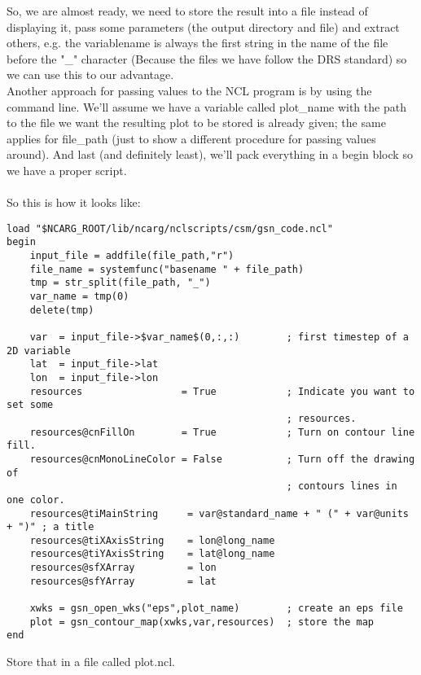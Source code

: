 \documentclass[a4paper,11pt]{ltxdoc}
\begin{document}
So, we are almost ready, we need to store the result into a file instead of displaying it, pass some parameters (the output directory and file) and extract others, e.g. the variablename is always the first string in the name of the file before the "\_" character (Because the files we have follow the DRS standard) so we can use this to our advantage. \\
Another approach for passing values to the NCL program is by using the command line. We'll assume we have a variable called plot\_name with the path to the file we want the resulting plot to be stored is already given; the same applies for file\_path (just to show a different procedure for passing values around). And last (and definitely least), we'll pack everything in a begin block so we have a proper script. \\
\\
So this is how it looks like:
\begin{verbatim}
load "$NCARG_ROOT/lib/ncarg/nclscripts/csm/gsn_code.ncl" 
begin
    input_file = addfile(file_path,"r")
    file_name = systemfunc("basename " + file_path)
    tmp = str_split(file_path, "_")
    var_name = tmp(0)
    delete(tmp)

    var  = input_file->$var_name$(0,:,:)        ; first timestep of a 2D variable
    lat  = input_file->lat                      
    lon  = input_file->lon                      
    resources                 = True            ; Indicate you want to set some
                                                ; resources.
    resources@cnFillOn        = True            ; Turn on contour line fill.
    resources@cnMonoLineColor = False           ; Turn off the drawing of
                                                ; contours lines in one color.
    resources@tiMainString     = var@standard_name + " (" + var@units + ")" ; a title
    resources@tiXAxisString    = lon@long_name
    resources@tiYAxisString    = lat@long_name
    resources@sfXArray         = lon
    resources@sfYArray         = lat

    xwks = gsn_open_wks("eps",plot_name)        ; create an eps file
    plot = gsn_contour_map(xwks,var,resources)  ; store the map
end
\end{verbatim}

Store that in a file called plot.ncl. \\
\end{document}
